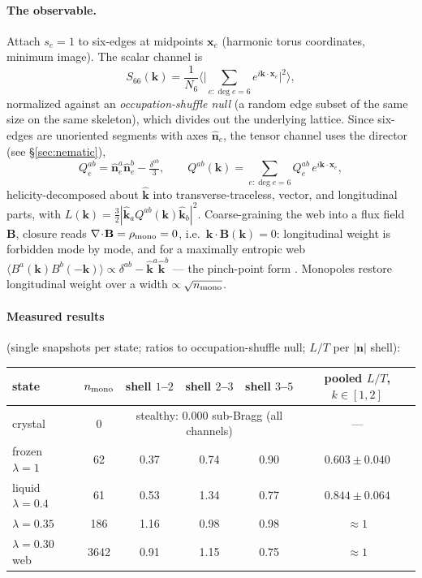\documentclass[11pt]{article}
\newcommand{\kh}{\hat{\mathbf k}}
\newcommand{\kv}{\mathbf k}
\newcommand{\nh}{\hat{\mathbf n}}
\begin{document}
\paragraph{The observable.} Attach $s_e = 1$ to six-edges at midpoints
$\mathbf x_e$ (harmonic torus coordinates, minimum image). The scalar
channel is
\begin{equation}
S_{66}(\kv) = \frac{1}{N_6}
\Big\langle \Big| \sum_{e: \deg e = 6} e^{i \kv\cdot \mathbf x_e} \Big|^2
\Big\rangle,
\end{equation}
normalized against an \emph{occupation-shuffle null} (a random edge subset
of the same size on the same skeleton), which divides out the underlying
lattice. Since six-edges are unoriented segments with axes $\nh_e$, the
tensor channel uses the director (see \S\ref{sec:nematic}),
\begin{equation}
Q^{ab}_e = \nh^a_e \nh^b_e - \tfrac{\delta^{ab}}{3},
\qquad
Q^{ab}(\kv) = \sum_{e:\deg e = 6} Q^{ab}_e\, e^{i\kv\cdot\mathbf x_e},
\label{eq:director}
\end{equation}
helicity-decomposed about $\kh$ into transverse-traceless, vector, and
longitudinal parts, with $L(\kv) = \tfrac32 |\kh_a Q^{ab}(\kv) \kh_b|^2$.
Coarse-graining the web into a flux field $\mathbf B$, closure reads
$\nabla\!\cdot\!\mathbf B = \rho_{\rm mono} = 0$, i.e.\
$\kv\cdot\mathbf B(\kv) = 0$: longitudinal weight is forbidden mode by mode,
and for a maximally entropic web
$\langle B^a(\kv) B^b(-\kv)\rangle \propto \delta^{ab} - \kh^a\kh^b$
--- the pinch-point form \cite{youngblood-axe,isakov}. Monopoles restore
longitudinal weight over a width $\propto \sqrt{n_{\rm mono}}$.

\paragraph{Measured results} (single snapshots per state; ratios to
occupation-shuffle null; $L/T$ per $|\mathbf n|$ shell):

\begin{center}
\begin{tabular}{lccccc}
\toprule
state & $n_{\rm mono}$ & shell $1$--$2$ & shell $2$--$3$ & shell $3$--$5$ & pooled $L/T$, $k\in[1,2]$ \\
\midrule
crystal & 0 & \multicolumn{3}{c}{stealthy: $0.000$ sub-Bragg (all channels)} & --- \\
frozen $\lambda=1$ & 62 & 0.37 & 0.74 & 0.90 & $\mathbf{0.603 \pm 0.040}$ \\
liquid $\lambda=0.4$ & 61 & 0.53 & 1.34 & 0.77 & $0.844 \pm 0.064$ \\
$\lambda=0.35$ & 186 & 1.16 & 0.98 & 0.98 & $\approx 1$ \\
$\lambda=0.30$ web & 3642 & 0.91 & 1.15 & 0.75 & $\approx 1$ \\
\bottomrule
\end{tabular}
\end{center}
\end{document}
